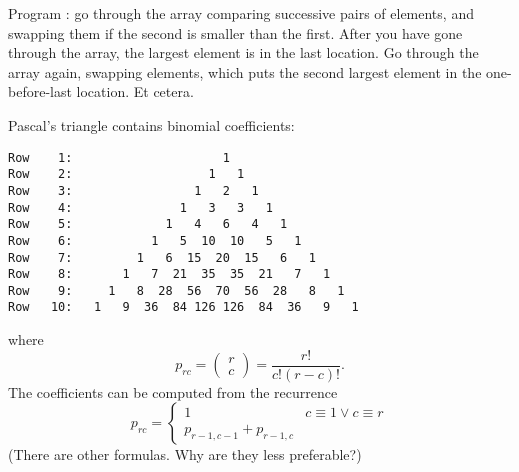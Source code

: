 \begin{exercise}
  Program : go through the array comparing
  successive pairs of elements, and swapping them if the second is
  smaller than the first. After you have gone through the array, the
  largest element is in the last location. Go through the array again,
  swapping elements, which puts the second largest element in the
  one-before-last location. Et cetera.
\end{exercise}

\begin{block}{Pascal's triangle}
  \label{sl:pascal-def}
  \small
   contains binomial coefficients:
{\scriptsize
\begin{verbatim}
Row    1:                     1
Row    2:                   1   1
Row    3:                 1   2   1
Row    4:               1   3   3   1
Row    5:             1   4   6   4   1
Row    6:           1   5  10  10   5   1
Row    7:         1   6  15  20  15   6   1
Row    8:       1   7  21  35  35  21   7   1
Row    9:     1   8  28  56  70  56  28   8   1
Row   10:   1   9  36  84 126 126  84  36   9   1
\end{verbatim}
}
where \[ p_{rc} = \begin{pmatrix} r\\c \end{pmatrix} = \frac{r!}{c!(r-c)! }. \]
The coefficients can be computed from the recurrence
\[ p_{rc} = 
\begin{cases}
  1&c\equiv 1\vee c\equiv r\\
  p_{r-1,c-1}+p_{r-1,c}
\end{cases}
\]
(There are other formulas. Why are they less preferable?)
\end{block}

